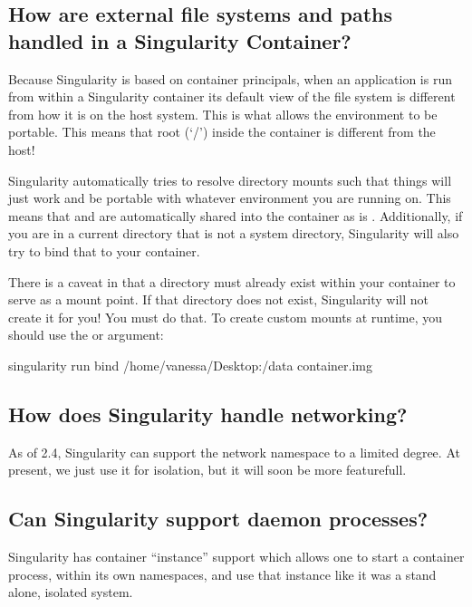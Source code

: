 \documentclass[letterpaper,10pt,english]{sphinxmanual}
\begin{document}
\subsection{How are external file systems and paths handled in a Singularity Container?}
\label{\detokenize{faq:how-are-external-file-systems-and-paths-handled-in-a-singularity-container}}
Because Singularity is based on container principals, when an application is run from within a Singularity container its default
view of the file system is different from how it is on the host system. This is what allows the environment to be portable.
This means that root (‘/’) inside the container is different from the host!

Singularity automatically tries to resolve directory mounts such that things will just work and be portable with whatever environment
you are running on. This means that  and  are automatically shared into the container as is .
Additionally, if you are in a current directory that is not a system directory, Singularity will also try to bind that to your container.

There is a caveat in that a directory must already exist within your container to serve as a mount point. If that directory does not exist,
Singularity will not create it for you! You must do that. To create custom mounts at runtime, you should use the  or  argument:

%
\begin{sphinxVerbatim}[commandchars=\\\{\}]
singularity run \PYGZhy{}\PYGZhy{}bind /home/vanessa/Desktop:/data container.img
\end{sphinxVerbatim}


\subsection{How does Singularity handle networking?}
\label{\detokenize{faq:how-does-singularity-handle-networking}}
As of 2.4, Singularity can support the network namespace to a limited degree. At present, we just use it for isolation,
but it will soon be more featurefull.


\subsection{Can Singularity support daemon processes?}
\label{\detokenize{faq:can-singularity-support-daemon-processes}}
Singularity has container “instance” support which allows one to start a container process, within its own namespaces, and use that instance
like it was a stand alone, isolated system.
\end{document}
